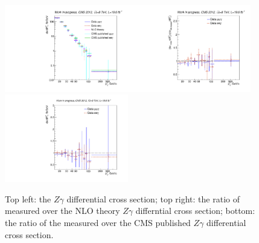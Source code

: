 \begin{figure}[htb]
  \begin{center}
   \includegraphics[width=0.48\textwidth]{../figs/figs_v11/ChannelsMERGED_ZGamma/CrossSection/compareCSZGamma.pdf}\includegraphics[width=0.48\textwidth]{../figs/figs_v11/ChannelsMERGED_ZGamma/CrossSection/compareCSratioTheoryZGamma.pdf}
   \includegraphics[width=0.48\textwidth]{../figs/figs_v11/ChannelsMERGED_ZGamma/CrossSection/compareCSratioOttoZGamma.pdf}
     
  \caption{Top left: the $Z\gamma$ differential cross section; top right: the ratio of measured over the NLO theory $Z\gamma$ differntial cross section; bottom: the ratio of the measured over the CMS published $Z\gamma$ differential cross section. }
  \label{fig:CS_Zg}
 \end{center}
\end{figure}

